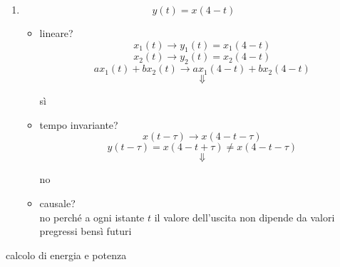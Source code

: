 \documentclass{article}
\begin{document}
\begin{enumerate}
            \item \LARGE\[y(t)=x(4-t)\]\normalsize
            \begin{itemize}
                \item lineare?
                    \[x_1(t)\to y_1(t)=x_1(4-t)\]
                    \[x_2(t)\to y_2(t)=x_2(4-t)\]
                    \[ax_1(t)+bx_2(t)\to ax_1(4-t)+bx_2(4-t)\]
                    \[\Downarrow\]
                    \begin{center}sì\end{center}
                \item tempo invariante?
                    \[x(t-\tau)\to x(4-t-\tau)\]
                    \[y(t-\tau)=x(4-t+\tau)\neq x(4-t-\tau)\]
                    \[\Downarrow\]
                    \begin{center}no\end{center}
                \item causale?\\
                no perché a ogni istante \(t\) il valore dell'uscita non dipende da valori pregressi bensì futuri
            \end{itemize}
\end{enumerate}
\begin{center}calcolo di energia e potenza\end{center}
\end{document}
